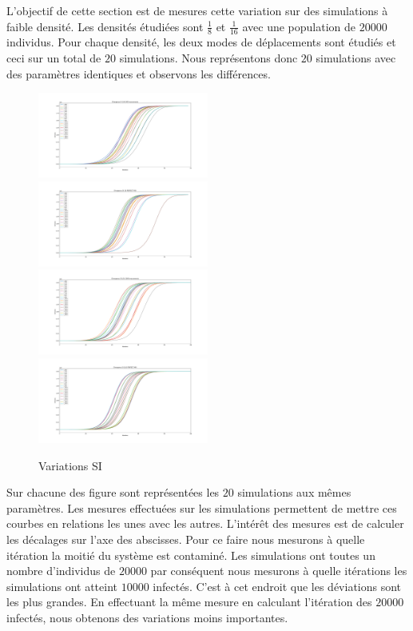L'objectif de cette section est de mesures cette variation sur des simulations à faible densité. Les densités étudiées sont $\frac{1}{8}$ et $\frac{1}{16}$ avec une population de $20000$ individus. Pour chaque densité, les deux modes de déplacements sont étudiés et ceci sur un total de $20$ simulations. Nous représentons donc $20$ simulations avec des paramètres identiques et observons les différences.

\newpage

\begin{figure}
    \centering
    \captionsetup{justification=centering}
    \includegraphics[width=0.5\textwidth]{Images/SI_divergence_8_1000.pdf}
    \includegraphics[width=0.5\textwidth]{Images/SI_divergence_8_mix.pdf}
    \includegraphics[width=0.5\textwidth]{Images/SI_divergence_16_1000.pdf}
    \includegraphics[width=0.5\textwidth]{Images/SI_divergence_16_mix.pdf}
    \caption{Variations SI}
\end{figure}

Sur chacune des figure sont représentées les $20$ simulations aux mêmes paramètres. Les mesures effectuées sur les simulations permettent de mettre ces courbes en relations les unes avec les autres. L'intérêt des mesures est de calculer les décalages sur l'axe des abscisses. Pour ce faire nous mesurons à quelle itération la moitié du système est contaminé. Les simulations ont toutes un nombre d'individus de $20000$ par conséquent nous mesurons à quelle itérations les simulations ont atteint $10000$ infectés. C'est à cet endroit que les déviations sont les plus grandes. En effectuant la même mesure en calculant l'itération des $20000$ infectés, nous obtenons des variations moins importantes.\\

